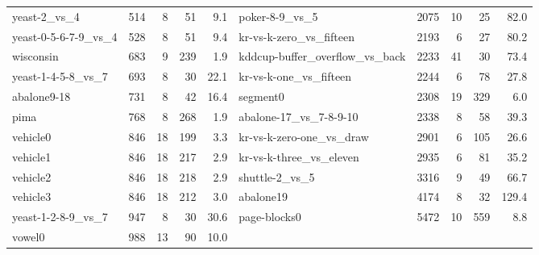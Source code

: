 \begin{table}[t]
\begin{tabular}{@{}lrrrr@{\hspace{14pt}}lrrrr@{}}
yeast-2\_vs\_4 & 514 & 8 & 51 & 9.1 & poker-8-9\_vs\_5 & 2075 & 10 & 25 & 82.0 \\
yeast-0-5-6-7-9\_vs\_4 & 528 & 8 & 51 & 9.4 & kr-vs-k-zero\_vs\_fifteen & 2193 & 6 & 27 & 80.2 \\
wisconsin & 683 & 9 & 239 & 1.9 & kddcup-buffer\_overflow\_vs\_back & 2233 & 41 & 30 & 73.4 \\
yeast-1-4-5-8\_vs\_7 & 693 & 8 & 30 & 22.1 & kr-vs-k-one\_vs\_fifteen & 2244 & 6 & 78 & 27.8 \\
abalone9-18 & 731 & 8 & 42 & 16.4 & segment0 & 2308 & 19 & 329 & 6.0 \\
pima & 768 & 8 & 268 & 1.9 & abalone-17\_vs\_7-8-9-10 & 2338 & 8 & 58 & 39.3 \\
vehicle0 & 846 & 18 & 199 & 3.3 & kr-vs-k-zero-one\_vs\_draw & 2901 & 6 & 105 & 26.6 \\
vehicle1 & 846 & 18 & 217 & 2.9 & kr-vs-k-three\_vs\_eleven & 2935 & 6 & 81 & 35.2 \\
vehicle2 & 846 & 18 & 218 & 2.9 & shuttle-2\_vs\_5 & 3316 & 9 & 49 & 66.7 \\
vehicle3 & 846 & 18 & 212 & 3.0 & abalone19 & 4174 & 8 & 32 & 129.4 \\
yeast-1-2-8-9\_vs\_7 & 947 & 8 & 30 & 30.6 & page-blocks0 & 5472 & 10 & 559 & 8.8 \\
vowel0 & 988 & 13 & 90 & 10.0 & & & & & \\
\bottomrule
\end{tabular}
\end{table}
